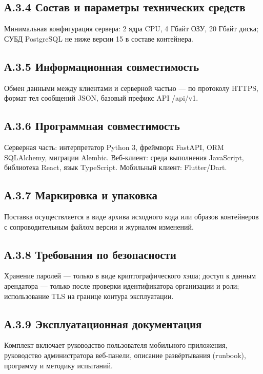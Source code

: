 \subsection*{А.3.4 Состав и параметры технических средств}

Минимальная конфигурация сервера: 2 ядра CPU, 4 Гбайт ОЗУ, 20 Гбайт диска; СУБД PostgreSQL не ниже версии 15 в составе контейнера.

\subsection*{А.3.5 Информационная совместимость}

Обмен данными между клиентами и серверной частью --- по протоколу HTTPS, формат тел сообщений JSON, базовый префикс API /api/v1.

\subsection*{А.3.6 Программная совместимость}

Серверная часть: интерпретатор Python 3, фреймворк FastAPI, ORM SQLAlchemy, миграции Alembic. Веб-клиент: среда выполнения JavaScript, библиотека React, язык TypeScript. Мобильный клиент: Flutter/Dart.

\subsection*{А.3.7 Маркировка и упаковка}

Поставка осуществляется в виде архива исходного кода или образов контейнеров с сопроводительным файлом версии и журналом изменений.

\subsection*{А.3.8 Требования по безопасности}

Хранение паролей --- только в виде криптографического хэша; доступ к данным арендатора --- только после проверки идентификатора организации и роли; использование TLS на границе контура эксплуатации.

\subsection*{А.3.9 Эксплуатационная документация}

Комплект включает руководство пользователя мобильного приложения, руководство администратора веб-панели, описание развёртывания (runbook), программу и методику испытаний.

